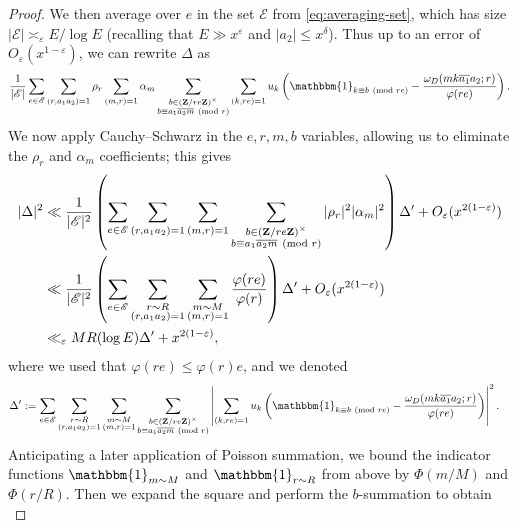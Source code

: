 \documentclass[reqno,11pt]{amsart}
\theoremstyle{definition}
\theoremstyle{remark}
\numberwithin{equation}{section}
\newcommand{\Z}{\mathbf{Z}}
\newcommand{\msE}{\mathscr{E}}
\newcommand{\mE}{\mathcal{E}}
\newcommand{\one}{\mathbbm{1}}
\newcommand{\eps}{\varepsilon}
\renewcommand{\bar}{\overline}
\renewcommand{\pmod}[1]{\ (\textnormal{mod } #1)}
\begin{document}
\begin{proof}
We then average over $e$ in the set $\mE$ from \cref{eq:averaging-set},
which has size $|\msE| \asymp_\eps E/\log E$ (recalling that $E \gg x^{\eps}$ and $|a_2| \le x^\delta$). Thus up to an error of $O_\eps(x^{1-\eps})$, we can rewrite $\Delta$ as
\[
    \frac{1}{|\msE|} \sum_{e \in \msE} \sum_{(r,a_1a_2)=1} \rho_r \sum_{(m,r)=1} \alpha_m \sum_{\substack{b \in (\Z/re\Z)^\times \\ b \equiv a_1\bar{a_2 m} \pmod{r}}} \sum_{(k,re)=1} u_k \left(\one_{k \equiv b \pmod{re}} - \frac{\omega_D(mk \bar{a_1}a_2; r)}{\varphi(re)} \right).
\]
We now apply Cauchy--Schwarz in the $e,r,m,b$ variables, allowing us to eliminate the $\rho_r$ and $\alpha_m$ coefficients; this gives
\begin{equation} \label{eq:delta-squared}
\begin{aligned}
    |\Delta|^2 &\ll 
    \frac{1}{|\msE|^2} \left( 
    \sum_{e \in \msE} \sum_{(r,a_1a_2)=1} \sum_{(m,r)=1}  \sum_{\substack{b \in (\Z/re\Z)^\times \\ b \equiv a_1\bar{a_2 m} \pmod{r}}} |\rho_r|^2 |\alpha_m|^2
    \right) \Delta' 
    +
    O_\eps(x^{2(1-\eps)})
    \\ 
    &\ll
    \frac{1}{|\msE|^2} \left( 
    \sum_{e \in \msE} \sum_{\substack{r \sim R \\ (r,a_1a_2)=1}} \sum_{\substack{m \sim M \\ (m,r)=1}}  \frac{\varphi(re)}{\varphi(r)}
    \right) \Delta' 
    +
    O_\eps(x^{2(1-\eps)})
    \\
    &\ll_\eps 
    MR (\log E) \Delta' + x^{2(1-\eps)},
\end{aligned}
\end{equation}
where we used that $\varphi(re) \le \varphi(r) e$, and we denoted
\[
\begin{aligned}
    \Delta' &:= \sum_{e \in \msE} \sum_{\substack{r \sim R \\ (r,a_1a_2)=1}} \sum_{\substack{m \sim M \\ (m,r)=1}} \sum_{\substack{b \in (\Z/re\Z)^\times \\ b \equiv a_1\bar{a_2 m} \pmod{r}}} \left\vert \sum_{(k,re)=1} u_k \left(\one_{k \equiv b \pmod{re}} - \frac{\omega_D(mk \bar{a_1}a_2; r)}{\varphi(re)} \right)\right\vert^2.
\end{aligned}
\]
Anticipating a later application of Poisson summation, we bound the indicator functions $\one_{m \sim M}$ and $\one_{r \sim R}$ from above by $\Phi(m/M)$ and $\Phi(r/R)$. Then we expand the square and perform the $b$-summation to obtain
\begin{equation} \label{eq:delta-prime}

\end{equation}
\end{proof}
\end{document}
